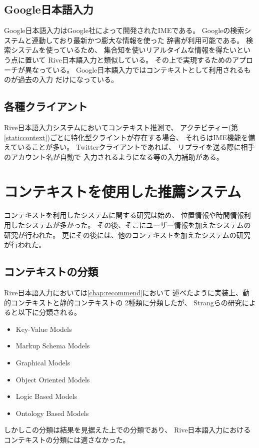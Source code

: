 \subsection{Google日本語入力}
Google日本語入力はGoogle社によって開発されたIMEである。
Googleの検索システムと連動しており最新かつ膨大な情報を使った
辞書が利用可能である。
検索システムを使っているため、
集合知を使いリアルタイムな情報を得たいという点に置いて
Rive日本語入力と類似している。
その上で実現するためのアプローチが異なっている。
Google日本語入力ではコンテキストとして利用されるものが過去の入力
だけになっている。

\subsection{各種クライアント}
Rive日本語入力システムにおいてコンテキスト推測で、
アクテビティー(第\ref{staticcontext})ごとに特化型クライントが存在する場合、
それらはIME機能を備えていることが多い。
Twitterクライアントであれば、
リプライを送る際に相手のアカウント名が自動で
入力されるようになる等の入力補助がある。

\section{コンテキストを使用した推薦システム}
コンテキストを利用したシステムに関する研究は始め、
位置情報や時間情報利用したシステムが多かった。
その後、そこにユーザー情報を加えたシステムの研究が行われた。
更にその後には、他のコンテキストを加えたシステムの研究が行われた。
\cite{okukenta}

\subsection{コンテキストの分類}
Rive日本語入力においては\ref{chap:recommend}において
述べたように実装上、動的コンテキストと静的コンテキストの
2種類に分類したが、
Strangらの研究\cite{contextsurvey}によると以下に分類される。
\begin{itemize}
  \item Key-Value Models
  \item Markup Schema Models
  \item Graphical Models
  \item Object Oriented Models
  \item Logic Based Models
  \item Ontology Based Models
\end{itemize}
しかしこの分類は結果を見据えた上での分類であり、
Rive日本語入力におけるコンテキストの分類には適さなかった。
